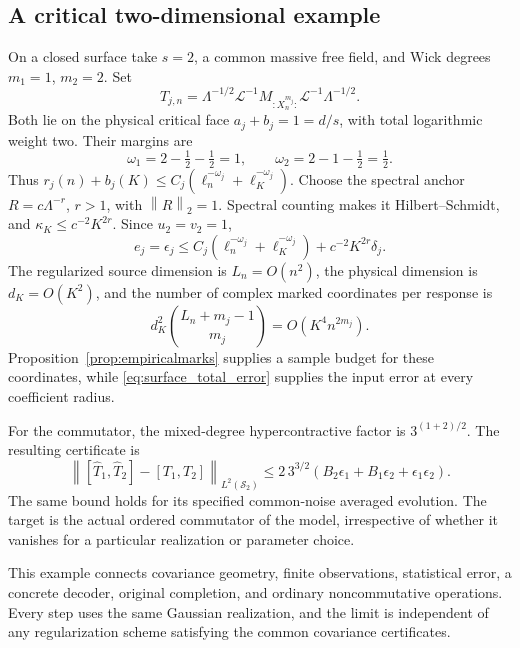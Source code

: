 \documentclass[11pt,a4paper]{amsart}
\numberwithin{equation}{section}
\theoremstyle{definition}
\theoremstyle{remark}
\newcommand{\Sch}{\mathcal S}
\newcommand{\norm}[1]{\left\lVert#1\right\rVert}
\begin{document}
\subsection{A critical two-dimensional example}
On a closed surface take $s=2$, a common massive free field, and Wick degrees $m_1=1$, $m_2=2$. Set
\begin{equation}\label{eq:surface_pair}
 T_{j,n}=\Lambda^{-1/2}\mathscr L^{-1}
          M_{{:X_n^{m_j}:}}\mathscr L^{-1}\Lambda^{-1/2}.
\end{equation}
Both lie on the physical critical face $a_j+b_j=1=d/s$, with total logarithmic weight two. Their margins are
\[
 \omega_1=2-\tfrac12-\tfrac12=1,\qquad
 \omega_2=2-1-\tfrac12=\tfrac12.
\]
Thus $r_j(n)+b_j(K)\le C_j(\ell_n^{-\omega_j}+\ell_K^{-\omega_j})$. Choose the spectral anchor $R=c\Lambda^{-r}$, $r>1$, with $\norm R_2=1$. Spectral counting makes it Hilbert--Schmidt, and $\kappa_K\le c^{-2}K^{2r}$. Since $u_2=v_2=1$,
\begin{equation}\label{eq:surface_total_error}
 e_j=\epsilon_j\le C_j(\ell_n^{-\omega_j}+\ell_K^{-\omega_j})
                         +c^{-2}K^{2r}\delta_j.
\end{equation}
The regularized source dimension is $L_n=O(n^2)$, the physical dimension is $d_K=O(K^2)$, and the number of complex marked coordinates per response is
\[
 d_K^2\binom{L_n+m_j-1}{m_j}=O(K^4n^{2m_j}).
\]
Proposition~\ref{prop:empiricalmarks} supplies a sample budget for these coordinates, while \eqref{eq:surface_total_error} supplies the input error at every coefficient radius.

For the commutator, the mixed-degree hypercontractive factor is $3^{(1+2)/2}$. The resulting certificate is
\begin{equation}\label{eq:surface_commutator_budget}
 \norm{[\widehat T_1,\widehat T_2]-[T_1,T_2]}_{L^2(\Sch_2)}
 \le2\,3^{3/2}(B_2\epsilon_1+B_1\epsilon_2+\epsilon_1\epsilon_2).
\end{equation}
The same bound holds for its specified common-noise averaged evolution. The target is the actual ordered commutator of the model, irrespective of whether it vanishes for a particular realization or parameter choice.

This example connects covariance geometry, finite observations, statistical error, a concrete decoder, original completion, and ordinary noncommutative operations. Every step uses the same Gaussian realization, and the limit is independent of any regularization scheme satisfying the common covariance certificates.
\end{document}
